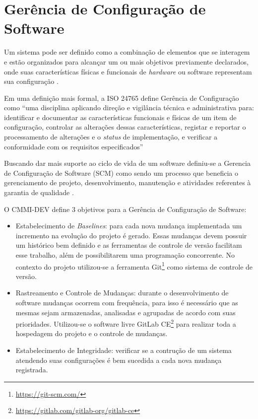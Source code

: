 \chapter{Gerência de Configuração de Software}
Um sistema pode ser definido como a combinação de elementos que se interagem e estão organizados para alcançar um ou mais objetivos previamente declarados, onde suas características físicas e funcionais de \textit{hardware} ou software representam sua configuração \cite{SWEBOK2014}.

Em uma definição mais formal, a ISO 24765 \cite{iso_24765} define Gerência de Configuração como ``uma disciplina aplicando direção e vigilância técnica e administrativa para: identificar e documentar as características funcionais e físicas de um item de configuração, controlar as alterações dessas características, registar e reportar o processamento de alterações e o \textit{status} de implementação, e verificar a conformidade com os requisitos especificados''

Buscando dar mais suporte ao ciclo de vida de um software definiu-se a Gerencia de Configuração de Software (SCM) como sendo um processo que beneficia o gerenciamento de projeto, desenvolvimento, manutenção e atividades referentes à garantia de qualidade \cite{SWEBOK2014}.

O CMMI-DEV \cite{cmmi_dev} define 3 objetivos para a Gerência de Configuração de Software:
\begin{itemize}
    \item Estabelecimento de \textit{Baselines}: para cada nova mudança implementada um incremento na evolução do projeto é gerado. Essas mudanças devem possuir um histórico bem definido e as ferramentas de controle de versão facilitam esse trabalho, além de possibilitarem uma programação concorrente. No contexto do projeto utilizou-se a ferramenta Git\footnote{\url{https://git-scm.com/}} como sistema de controle de versão.
    \item Rastreamento e Controle de Mudanças: durante o desenvolvimento de software mudanças ocorrem com frequência, para isso é necessário que as mesmas sejam armazenadas, analisadas e agrupadas de acordo com suas prioridades. Utilizou-se o software livre GitLab CE\footnote{\url{https://gitlab.com/gitlab-org/gitlab-ce}} para realizar toda a hospedagem do projeto e o controle de mudanças.
    \item Estabelecimento de Integridade: verificar se a contrução de um sistema atendendo suas configurações é bem sucedida a cada nova mudança registrada.
\end{itemize}